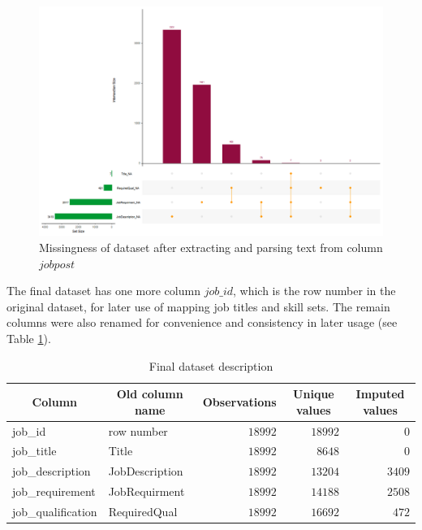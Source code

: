 \documentclass[a4paper,man,floatsintext,natbib,noextraspace]{apa6}
\begin{document}
\begin{figure}[!htbp]
    \centering
    \includegraphics[width=\textwidth]{retrieval_missingness.png}
    \caption[Missingness of dataset after parsing text from $jobpost$]{Missingness of dataset after extracting and parsing text from column $jobpost$
    \label{fig:retrieval_missingness}}
\end{figure}

The final dataset has one more column $job\_id$, which is the row number in the original dataset, for later use of mapping job titles and skill sets. The remain columns were also renamed for convenience and consistency in later usage (see Table \ref{tbl:final_data_description}).

\begin{table}[!htbp]
    \caption{Final dataset description\label{tbl:final_data_description}} 
    \begin{center}
    \begin{tabular}{llrrr}
    \hline\hline
    \multicolumn{1}{c}{Column}&\multicolumn{1}{c}{Old column name}&\multicolumn{1}{c}{Observations}&\multicolumn{1}{c}{Unique values}&\multicolumn{1}{c}{Imputed values}\tabularnewline
    \hline
    job\_id&row number&$18992$&$18992$&$   0$\tabularnewline
    job\_title&Title&$18992$&$ 8648$&$   0$\tabularnewline
    job\_description&JobDescription&$18992$&$13204$&$3409$\tabularnewline
    job\_requirement&JobRequirment&$18992$&$14188$&$2508$\tabularnewline
    job\_qualification&RequiredQual&$18992$&$16692$&$ 472$\tabularnewline
    \hline
    \end{tabular}\end{center}
    \end{table}
\end{document}
